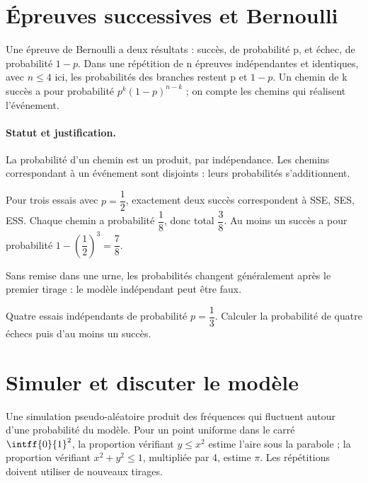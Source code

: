 \section{Épreuves successives et Bernoulli}\label{C05-U4}
\begin{keypoint}
Une épreuve de Bernoulli a deux résultats : succès, de probabilité p, et échec, de probabilité $1-p$. Dans une répétition de n épreuves indépendantes et identiques, avec $n\leq4$ ici, les probabilités des branches restent p et $1-p$. Un chemin de k succès a pour probabilité $p^k(1-p)^{n-k}$ ; on compte les chemins qui réalisent l’événement.
\end{keypoint}
\paragraph{Statut et justification.} La probabilité d’un chemin est un produit, par indépendance. Les chemins correspondant à un événement sont disjoints : leurs probabilités s’additionnent.
\begin{example}Pour trois essais avec $p=\dfrac{1}{2}$, exactement deux succès correspondent à SSE, SES, ESS. Chaque chemin a probabilité $\dfrac{1}{8}$, donc total $\dfrac{3}{8}$. Au moins un succès a pour probabilité $1-(\dfrac{1}{2})^3=\dfrac{7}{8}$.\end{example}\label{C05-EX4}
\begin{pitfall}Sans remise dans une urne, les probabilités changent généralement après le premier tirage : le modèle indépendant peut être faux.\end{pitfall}
\begin{application}Quatre essais indépendants de probabilité $p=\dfrac{1}{3}$. Calculer la probabilité de quatre échecs puis d’au moins un succès.\end{application}\label{C05-AP4}
\section{Simuler et discuter le modèle}\label{C05-U5}
\begin{keypoint}
Une simulation pseudo-aléatoire produit des fréquences qui fluctuent autour d’une probabilité du modèle. Pour un point uniforme dans le carré $\intff{0}{1}^2$, la proportion vérifiant $y\leq x^2$ estime l’aire sous la parabole ; la proportion vérifiant $x^2+y^2\leq1$, multipliée par 4, estime $\pi$. Les répétitions doivent utiliser de nouveaux tirages.
\end{keypoint}
